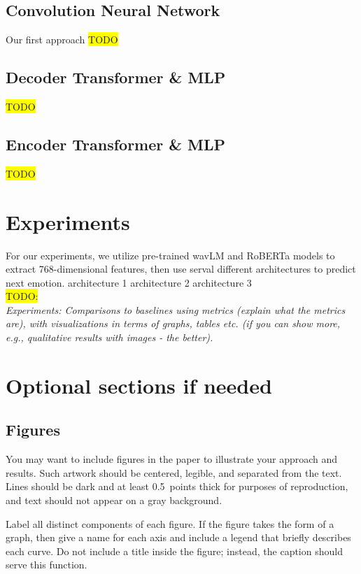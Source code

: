 \documentclass{article}
\begin{document}
\subsection{Convolution Neural Network}
Our first approach
\colorbox{yellow}{TODO}\\

\subsection{Decoder Transformer \& MLP}
\colorbox{yellow}{TODO}\\

\subsection{Encoder Transformer \& MLP}
\colorbox{yellow}{TODO}\\


\section{Experiments}
For our experiments, we utilize pre-trained wavLM and RoBERTa
models to extract 768-dimensional features, then use serval different architectures to predict next emotion.
architecture 1
architecture 2
architecture 3
\\ \colorbox{yellow}{TODO:}\\
\textit{Experiments: Comparisons to baselines using metrics (explain what the metrics are), with visualizations in terms of graphs, tables etc. (if you can show more, e.g., qualitative results with images - the better).}\\


\section{Optional sections if needed}

\subsection{Figures}

You may want to include figures in the paper to illustrate
your approach and results. Such artwork should be centered,
legible, and separated from the text. Lines should be dark and at
least 0.5~points thick for purposes of reproduction, and text should
not appear on a gray background.

Label all distinct components of each figure. If the figure takes the
form of a graph, then give a name for each axis and include a legend
that briefly describes each curve. Do not include a title inside the
figure; instead, the caption should serve this function.
\end{document}
